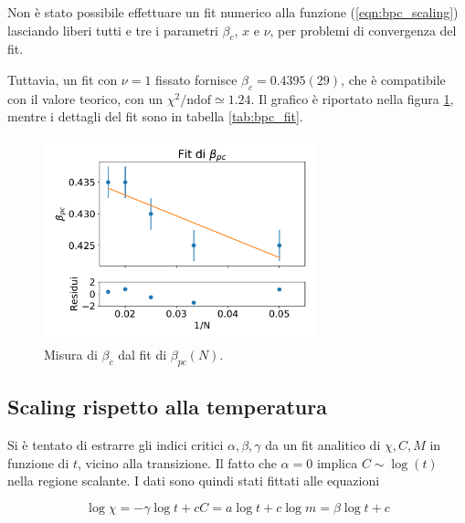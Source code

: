 \documentclass[a4paper,11pt]{article}
\begin{document}
    Non è stato possibile effettuare un fit numerico alla funzione (\ref{eqn:bpc_scaling}) lasciando liberi tutti e tre i parametri $\beta_c$, $x$ e $\nu$, per problemi di convergenza del fit.
    
    Tuttavia, un fit con $\nu = 1$ fissato fornisce $\beta_c = 0.4395(29)$, che è compatibile con il valore teorico, con un $\chi^2 / \text{ndof} \simeq 1.24$. Il grafico è riportato nella figura \ref{fig:bpc_fit}, mentre i dettagli del fit sono in tabella \ref{tab:bpc_fit}.
    
    \begin{figure}
        \centering
        \includegraphics[width=0.7\textwidth]{figure/fit_bpc.pdf}
        \caption{Misura di $\beta_c$ dal fit di $\beta_{pc}(N)$.}
        \label{fig:bpc_fit}
    \end{figure}
    



	
	\subsection{Scaling rispetto alla temperatura}
	
	Si è tentato di estrarre gli indici critici $\alpha, \beta, \gamma$ da un fit analitico di $\chi, C, M$ in funzione di $t$, vicino alla transizione.
	Il fatto che $\alpha = 0$ implica $C \sim \log(t)$ nella regione scalante. I dati sono quindi stati fittati alle equazioni
	
	\begin{subequations}
        \begin{equation}
            \log \chi = - \gamma \log t + c
        \end{equation}
         \begin{equation}
            C = a \log t + c
        \end{equation}  
        \begin{equation}
            \log m = \beta \log t + c
        \end{equation}
	\end{subequations}
\end{document}
